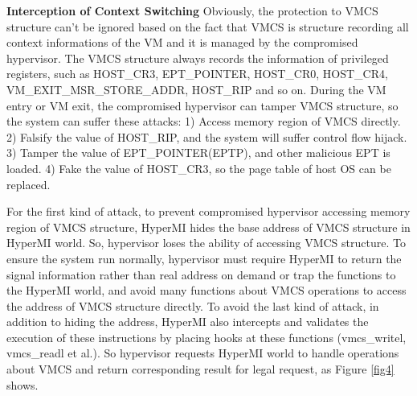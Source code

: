 \documentclass[conference]{IEEEtran}
\begin{document}
\textbf{Interception of Context Switching}
Obviously, the protection to VMCS structure can't be ignored based on the fact that VMCS is structure recording all context informations of the VM and it is managed by the compromised hypervisor. 
The VMCS structure always records the information of privileged registers, such as HOST\_CR3, EPT\_POINTER, HOST\_CR0, HOST\_CR4, VM\_EXIT\_MSR\_STORE\_ADDR, HOST\_RIP and so on. During the VM entry or VM exit, the compromised hypervisor can tamper VMCS structure, so the system can suffer these attacks: 1) Access memory region of VMCS directly. 2) Falsify the value of HOST\_RIP, and the system will suffer control flow hijack. 3) Tamper the value of EPT\_POINTER(EPTP), and other malicious EPT is loaded. 4) Fake the value of HOST\_CR3, so the page table of host OS can be replaced.

For the first kind of attack, to prevent compromised hypervisor accessing memory region of VMCS structure, HyperMI hides the base address of VMCS structure in HyperMI world. So, hypervisor loses the ability of accessing VMCS structure. To ensure the system run normally, hypervisor must require HyperMI to return the signal information rather than real address on demand or trap the functions to the HyperMI world, and avoid many functions about VMCS operations to access the address of VMCS structure directly. To avoid the last kind of attack, in addition to hiding the address, HyperMI also intercepts and validates the execution of these instructions by placing hooks at these functions (vmcs\_writel, vmcs\_readl et al.). So hypervisor requests HyperMI world to handle operations about VMCS and return corresponding result for legal request, as Figure \ref{fig4} shows.
\end{document}
